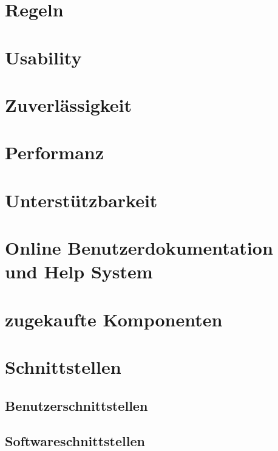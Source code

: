 \documentclass[a4paper,12pt,twoside]{scrreprt}
\begin{document}
    \section{Regeln}
        
    \section{Usability}
        
    \section{Zuverlässigkeit}
        
    \section{Performanz}
        
    \section{Unterstützbarkeit}
        
    \section{Online Benutzerdokumentation und Help System}
        
    \section{zugekaufte Komponenten}
        
    \section{Schnittstellen}
    \subsection{Benutzerschnittstellen}
        
    \subsection{Softwareschnittstellen}
        
\end{document}
